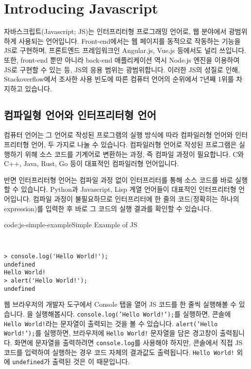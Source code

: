\section{Introducing Javascript} \label{sect:introducing-javascript}

자바스크립트(Javascript; JS)는 인터프리터형 프로그래밍 언어로, 웹 분야에서 광범위하게 사용되는 언어입니다. Front-end에서는 웹 페이지를 동적으로 작동하는 기능을 JS로 구현하며, 프론트엔드 프레임워크인 Angular.js, Vue.js 등에서도 널리 쓰입니다. 또한, front-end 뿐만 아니라 back-end 애플리케이션 역시 Node.js 엔진을 이용하여 JS로 구현할 수 있는 등, JS의 응용 범위는 광범위합니다. 이러한 JS의 성질로 인해, Stackoverflow에서 조사한 사용 빈도에 따른 컴퓨터 언어의 순위에서 7년째 1위를 차지하고 있습니다. 

\subsection*{컴파일형 언어와 인터프리터형 언어}

컴퓨터 언어는 그 언어로 작성된 프로그램의 실행 방식에 따라 컴파일러형 언어와 인터프리터형 언어, 두 가지로 나눌 수 있습니다. 컴파일러형 언어로 작성된 프로그램은 실행하기 위해 소스 코드를 기계어로 변환하는 과정, 즉 컴파일 과정이 필요합니다. C와 C++, Java, Rust, Go 등이 대표적인 컴파일러형 언어입니다. 

반면 인터프리터형 언어는 컴파일 과정 없이 인터프리터를 통해 소스 코드를 바로 실행할 수 있습니다. Python과 Javascript, Lisp 계열 언어들이 대표적인 인터프리터형 언어입니다. 컴파일 과정이 불필요하므로 인터프리터에 한 줄의 코드(정확히는 하나의 expression)를 입력한 후 바로 그 코드의 실행 결과를 확인할 수 있습니다. 

\begin{codeenv}{code:js-simple-example}{Simple Example of JS}\begin{verbatim}


> console.log('Hello World!');
undefined
Hello World!
> alert('Hello World!');
undefined
\end{verbatim}
\end{codeenv}

웹 브라우저의 개발자 도구에서 Console 탭을 열어 JS 코드를 한 줄씩 실행해볼 수 있습니다. 을 실행해봅시다. \texttt{console.log('Hello World!');}를 실행하면, 콘솔에 \texttt{Hello World!}라는 문자열이 출력되는 것을 볼 수 있습니다. \texttt{alert('Hello World!');}를 실행하면, 브라우저에 \texttt{Hello World!} 문자열을 담은 경고창이 출력됩니다. 화면에 문자열을 출력하려면 \texttt{console.log}를 사용해야 하지만, 콘솔에서 직접 JS 코드를 입력하여 실행하는 경우 코드 자체의 결과값도 출력됩니다. \texttt{Hello World!} 외에 \texttt{undefined}가 출력된 것은 이 때문입니다.
